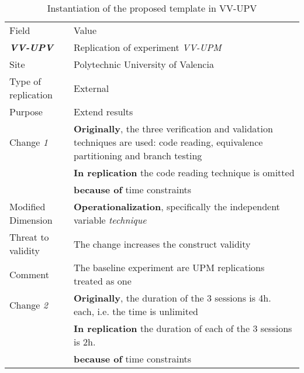 
\begin{table*}[h]
  \caption{Instantiation of the proposed template in VV-UPV}
\label{tab:plantEng}
  \centering

\begin{tabularx}{\textwidth}{
  >{\hsize=0.3\hsize}X
  >{\hsize=0.8\hsize}X}
  
    \noalign{\smallskip}\hline\noalign{\smallskip}
  
  Field &  Value  \\ 
  \noalign{\smallskip}\hline\noalign{\smallskip}
  
\textbf {\textit{VV-UPV}} &  Replication of experiment \textit{VV-UPM}    \\
Site &  Polytechnic University of Valencia \\  
Type of replication &  External   \\  
Purpose  &  Extend results \\   \hline
    
    Change \textit{1}   & \textbf{Originally}, the three verification and validation techniques are used: code reading, equivalence partitioning and branch testing \\& \textbf{In replication} the code reading technique is omitted  \\& \textbf{because of} time constraints \\
    
     Modified Dimension & 
   \textbf{Operationalization}, specifically the independent variable \textit {technique} \\ 
    Threat to validity & The change increases the construct validity \\  
    Comment & The baseline experiment are UPM replications treated as one 
    \\ \hline
    Change \textit{2}  & \textbf{Originally}, the duration of the 3 sessions is 4h. each, i.e. the time is unlimited \\& \textbf{In replication} the duration of each of the 3 sessions is 2h. \\& \textbf{because of} time constraints \\
    

\end{tabularx}
\end{table*}
